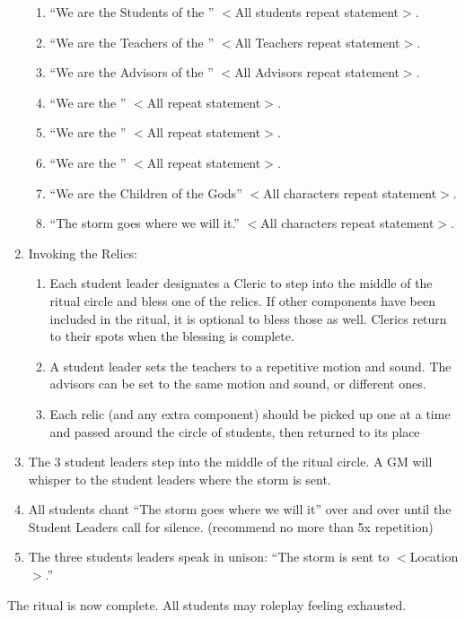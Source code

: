 \documentclass[green]{GL2020}
\begin{document}
\begin{enumerate}
\begin{enumerate}
\item “We are the Students of the \pSchool{}” $<$All students repeat statement$>$.
\item “We are the Teachers of the \pSchool{}” $<$All Teachers repeat statement$>$.
	\item “We are the Advisors of the \pSchool{}” $<$All Advisors repeat statement$>$.
\item “We are the \pFarm{}” $<$All \pFarm{} repeat statement$>$.
\item “We are the \pTech{}” $<$All \pTechies{} repeat statement$>$.
\item “We are the \pShip{}” $<$All \pShippies{} repeat statement$>$.
\item “We are the Children of the Gods” $<$All characters repeat statement$>$.
\item “The storm goes where we will it.” $<$All characters repeat statement$>$.
\end{enumerate}
\item Invoking the Relics:
\begin{enumerate}
\item Each student leader designates a Cleric to step into the middle of the ritual circle and bless one of the relics. If other components have been included in the ritual, it is optional to bless those as well. Clerics return to their spots when the blessing is complete.
\item A student leader sets the teachers to a repetitive motion and sound. The advisors can be set to the same motion and sound, or different ones.
\item Each relic (and any extra component) should be picked up one at a time and passed around the circle of students, then returned to its place
\end{enumerate} 
\item The 3 student leaders step into the middle of the ritual circle. A GM will whisper to the student leaders where the storm is sent.
\item All students chant “The storm goes where we will it” over and over until the Student Leaders call for silence. (recommend no more than 5x repetition)
\item The three students leaders speak in unison: “The storm is sent to $<$Location$>$.”
\end{enumerate}

The ritual is now complete. All students may roleplay feeling exhausted.
\end{document}
